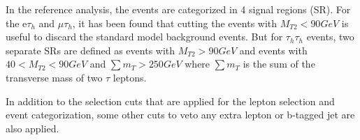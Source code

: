 In the reference analysis, the events are categorized in 4 signal regions (SR). For the e$\tau_h$ and $\mu\tau_h$, it has been found that cutting the events with $M_{T2}<90 GeV$ is useful to discard the standard model background events. But for $\tau_h \tau_h$ events, two separate SRs are defined as events with $M_{T2}>90 GeV$ and events with $40<M_{T2}<90 GeV$ and $\sum m_{T} > 250 GeV$ where $\sum m_{T}$ is the sum of the transverse mass of two $\tau$ leptons.

In addition to the selection cuts that are applied for the lepton selection and event categorization, some other cuts to veto any extra lepton or b-tagged jet  are also applied. 



 
 
